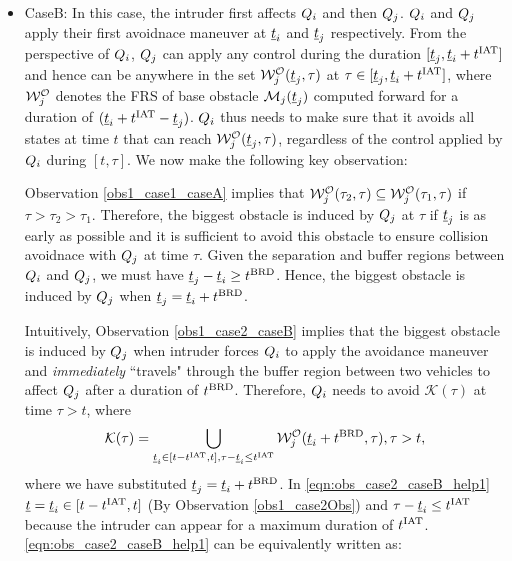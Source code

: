 \begin{itemize}[leftmargin=*]
\item \label{sec:intruderObs_case2_caseB} CaseB: In this case, the intruder first affects $Q_i$ and then $Q_j$. $Q_i$ and $Q_j$ apply their first avoidnace maneuver at $\underline{t}_i$ and $\underline{t}_j$ respectively. From the perspective  of $Q_i$, $Q_j$ can apply any control during the duration $[\underline{t}_j, \underline{t}_i + t^\text{IAT}]$ and hence can be anywhere in the set $\mathcal{W}_{j}^{\mathcal{O}}(\underline{t}_j, \tau)$ at $\tau \in [\underline{t}_j, \underline{t}_i + t^\text{IAT}]$, where $\mathcal{W}_{j}^{\mathcal{O}}$ denotes the FRS of base obstacle $\mathcal{M}_j(\underline{t}_j)$ computed forward for a duration of $(\underline{t}_i + t^\text{IAT} - \underline{t}_j)$. $Q_i$ thus needs to make sure that it avoids all states at time $t$ that can reach $\mathcal{W}_{j}^{\mathcal{O}}(\underline{t}_j, \tau)$, regardless of the control applied by $Q_i$ during $[t, \tau]$. We now make the following key observation:
\begin{observation} \label{obs1_case2_caseB}
Observation \ref{obs1_case1_caseA} implies that $\mathcal{W}_{j}^{\mathcal{O}}(\tau_2, \tau) \subseteq \mathcal{W}_{j}^{\mathcal{O}}(\tau_1, \tau)$ if $\tau > \tau_2 > \tau_1$. Therefore, the biggest obstacle is induced by $Q_j$ at $\tau$ if $\underline{t}_j$ is as early as possible and it is sufficient to avoid this obstacle to ensure collision avoidnace with $Q_j$ at time $\tau$. Given the separation and buffer regions between $Q_i$ and $Q_j$, we must have $\underline{t}_j - \underline{t}_i \geq t^\text{BRD}$. Hence, the biggest obstacle is induced by $Q_j$ when $\underline{t}_j = \underline{t}_i + t^\text{BRD}$. 
\end{observation}
Intuitively, Observation \ref{obs1_case2_caseB} implies that the biggest obstacle is induced by $Q_j$ when intruder forces $Q_i$ to apply the avoidance maneuver and \textit{immediately} ``travels" through the buffer region between two vehicles to affect $Q_j$ after a duration of $t^\text{BRD}$. Therefore, $Q_i$ needs to avoid $\mathcal{K}(\tau)$ at time $\tau > t$, where 
\begin{equation} \label{eqn:obs_case2_caseB_help1}
\mathcal{K}(\tau) =  \bigcup_{\tsa_i \in [t-\iat, t], \tau - \tsa_i \leq \iat} \frs_{j}^{\mathcal{O}}(\tsa_i + \brd, \tau), \tau>t,
\end{equation}
where we have substituted $\underline{t}_j = \underline{t}_i + t^\text{BRD}$. In \eqref{eqn:obs_case2_caseB_help1} $\underline{t} = \underline{t}_i \in [t-t^\text{IAT}, t]$ (By Observation \ref{obs1_case2Obs}) and $\tau - \underline{t}_i \leq t^\text{IAT}$ because the intruder can appear for a maximum duration of $t^\text{IAT}$. \eqref{eqn:obs_case2_caseB_help1} can be equivalently written as:  
\begin{equation} \label{eqn:obs_case2_caseB_help1}

\end{equation}
\end{itemize}
